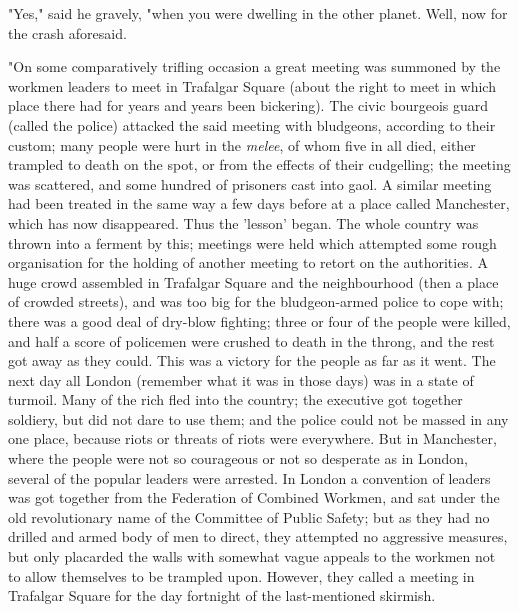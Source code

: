"Yes," said he gravely, "when you were dwelling in the other planet.
Well, now for the crash aforesaid.

"On some comparatively trifling occasion a great meeting was summoned by
the workmen leaders to meet in Trafalgar Square (about the right to meet
in which place there had for years and years been bickering). The civic
bourgeois guard (called the police) attacked the said meeting with
bludgeons, according to their custom; many people were hurt in the
\emph{melee}, of whom five in all died, either trampled to death on the
spot, or from the effects of their cudgelling; the meeting was
scattered, and some hundred of prisoners cast into gaol. A similar
meeting had been treated in the same way a few days before at a place
called Manchester, which has now disappeared. Thus the 'lesson' began.
The whole country was thrown into a ferment by this; meetings were held
which attempted some rough organisation for the holding of another
meeting to retort on the authorities. A huge crowd assembled in
Trafalgar Square and the neighbourhood (then a place of crowded
streets), and was too big for the bludgeon-armed police to cope with;
there was a good deal of dry-blow fighting; three or four of the people
were killed, and half a score of policemen were crushed to death in the
throng, and the rest got away as they could. This was a victory for the
people as far as it went. The next day all London (remember what it was
in those days) was in a state of turmoil. Many of the rich fled into the
country; the executive got together soldiery, but did not dare to use
them; and the police could not be massed in any one place, because riots
or threats of riots were everywhere. But in Manchester, where the people
were not so courageous or not so desperate as in London, several of the
popular leaders were arrested. In London a convention of leaders was got
together from the Federation of Combined Workmen, and sat under the old
revolutionary name of the Committee of Public Safety; but as they had no
drilled and armed body of men to direct, they attempted no aggressive
measures, but only placarded the walls with somewhat vague appeals to
the workmen not to allow themselves to be trampled upon. However, they
called a meeting in Trafalgar Square for the day fortnight of the
last-mentioned skirmish.

